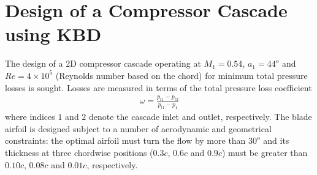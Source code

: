 



\section{Design of a Compressor Cascade using KBD}
\label{Drela1}
The design of a 2D compressor cascade operating at $M_1\!=\!0.54$, $a_1\!=\!44^o$ and $Re\!=\!4\times10^5$ (Reynolds number based on the chord) for minimum total pressure losses is sought. Losses are measured in terms of the total pressure loss coefficient 
\begin{eqnarray}
   \omega=\frac{p_{t1}-p_{t2}}{p_{t1}-p_1}
   \label{omegaLosses} 
\end{eqnarray}
where indices $1$ and $2$ denote the cascade inlet and outlet, respectively. 
The blade airfoil is designed subject to a number of aerodynamic and geometrical constraints: the optimal airfoil must turn the flow by more than $30^o$ and its thickness at three chordwise positions ($0.3c$, $0.6c$ and $0.9c$) must be greater than $0.10c$, $0.08c$ and $0.01c$,  respectively.     

